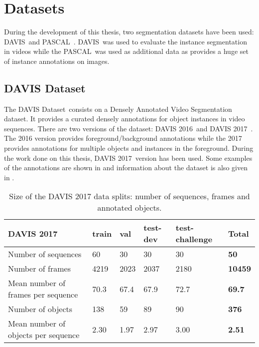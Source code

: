 \section{Datasets}

During the development of this thesis, two segmentation datasets have been used: DAVIS~\davisboth and PASCAL~\pascal.
DAVIS~\davisboth was used to evaluate the instance segmentation in videos while the PASCAL~\pascal was used as additional data as provides a huge set of instance annotations on images.

\subsection{DAVIS Dataset}

The DAVIS Dataset~\davisboth consists on a Densely Annotated Video Segmentation dataset.
It provides a curated densely annotations for object instances in video sequences.
There are two versions of the dataset: DAVIS 2016~\davisold and DAVIS 2017~\davislast.
The 2016 version provides foreground/background annotations while the 2017 provides annotations for multiple objects and instances in the foreground.
During the work done on this thesis, DAVIS 2017~\davislast version has been used.
Some examples of the annotations are shown in  and information about the dataset is also given in .

\begin{table}[h]
  \centering
  \begin{tabular}{l|llll|l}
    \toprule
    DAVIS 2017                          & train & val  & test-dev & test-challenge & \textbf{Total} \\
    \midrule
    Number of sequences                 & 60    & 30   & 30       & 30             & \textbf{50}    \\
    Number of frames                    & 4219  & 2023 & 2037     & 2180           & \textbf{10459} \\
    Mean number of frames per sequence  & 70.3  & 67.4 & 67.9     & 72.7           & \textbf{69.7}  \\
    Number of objects                   & 138   & 59   & 89       & 90             & \textbf{376}   \\
    Mean number of objects per sequence & 2.30  & 1.97 & 2.97     & 3.00           & \textbf{2.51} \\
    \bottomrule
  \end{tabular}
  \caption{Size of the DAVIS 2017 data splits: number of sequences, frames and annotated objects.}
  \label{tab:davis}
\end{table}

